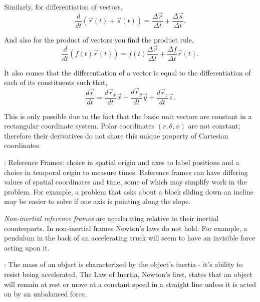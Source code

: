 \noindent Similarly, for differentiation of vectors,
\begin{equation*}
    \frac{d}{dt}(\vec{r}(t) + \vec{s}(t)) = \frac{\Delta \vec{r}}{\Delta t} + \frac{\Delta \vec{s}}{\Delta t}.
\end{equation*}

\noindent And also for the product of vectors you find the product rule,
\begin{equation*}
    \frac{d}{dt}(f(t) \vec{r}(t)) = f(t) \frac{\Delta \vec{r}}{\Delta t} + \frac{\Delta f}{\Delta t} \vec{r}(t).
\end{equation*}

\noindent It also comes that the differentiation of a vector is equal to the differentiation of each of its constituents such that,
\begin{equation*}
    \frac{d \vec{r}}{dt} = \frac{d \vec{r}_x}{dt}\vec{x} + \frac{d \vec{r}_y}{dt}\vec{y} + \frac{d \vec{r}_z}{dt}\vec{z}.
\end{equation*}

\noindent This is only possible due to the fact that the basic unit vectors are constant in a rectangular coordinate system. Polar coordinates $(r,\theta,\phi)$ are not constant; therefore their derivatives do not share this unique property of Cartesian coordinates.

\vspace{0.5cm} : Reference Frames: choice in spatial origin and axes to label positions and a choice in temporal origin to measure times. Reference frames can have differing values of spatial coordinates and time, some of which may simplify work in the problem. For example, a problem that asks about a block sliding down an incline may be easier to solve if one axis is pointing along the slope.

{\itshape Non-inertial reference frames} are accelerating relative to their inertial counterparts. In non-inertial frames Newton's laws do not hold. For example, a pendulum in the back of an accelerating truck will seem to have an invisible force acting upon it.

\vspace{0.5cm} : The mass of an object is characterized by the object's inertia - it's ability to resist being accelerated. The Law of Inertia, Newton's first, states that an object will remain at rest or move at a constant speed in a straight line unless it is acted on by an unbalanced force.

